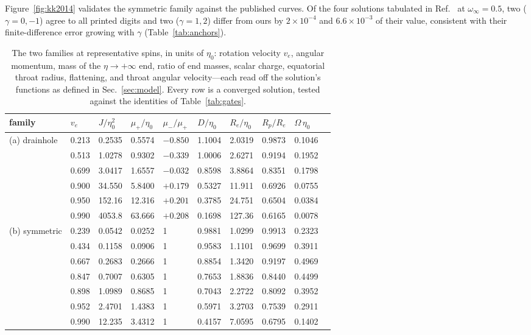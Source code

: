\documentclass[twocolumn,floatfix,aps,prd,superscriptaddress,nofootinbib]{revtex4-2}
\begin{document}
Figure~\ref{fig:kk2014} validates the symmetric family against the published curves. Of the four solutions tabulated in Ref.~\cite{chew2016} at $\omega_\infty=0.5$, two ($\gamma=0,-1$) agree to all printed digits and two ($\gamma=1,2$) differ from ours by $2\times10^{-4}$ and $6.6\times10^{-3}$ of their value, consistent with their finite-difference error growing with $\gamma$ (Table~\ref{tab:anchors}).

\begin{table}[t]
\caption{The two families at representative spins, in units of $\eta_0$: rotation velocity $v_e$, angular momentum, mass of the $\eta\to+\infty$ end, ratio of end masses, scalar charge, equatorial throat radius, flattening, and throat angular velocity---each read off the solution's functions as defined in Sec.~\ref{sec:model}. Every row is a converged solution, tested against the identities of Table~\ref{tab:gates}.}
\label{tab:backgrounds}
\scriptsize
\begin{ruledtabular}
\begin{tabular}{llllllllll}
family & $v_e$ & $J/\eta_0^2$ & $\mu_+/\eta_0$ & $\mu_-/\mu_+$ & $D/\eta_0$ & $R_e/\eta_0$ & $R_p/R_e$ & $\Omega\,\eta_0$ \\
\hline
(a) drainhole & 0.213 & 0.2535 & 0.5574 & $-0.850$ & 1.1004 & 2.0319 & 0.9873 & 0.1046 \\
              & 0.513 & 1.0278 & 0.9302 & $-0.339$ & 1.0006 & 2.6271 & 0.9194 & 0.1952 \\
              & 0.699 & 3.0417 & 1.6557 & $-0.032$ & 0.8598 & 3.8864 & 0.8351 & 0.1798 \\
              & 0.900 & 34.550 & 5.8400 & $+0.179$ & 0.5327 & 11.911 & 0.6926 & 0.0755 \\
              & 0.950 & 152.16 & 12.316 & $+0.201$ & 0.3785 & 24.751 & 0.6504 & 0.0384 \\
              & 0.990 & 4053.8 & 63.666 & $+0.208$ & 0.1698 & 127.36 & 0.6165 & 0.0078 \\
\hline
(b) symmetric & 0.239 & 0.0542 & 0.0252 & 1 & 0.9881 & 1.0299 & 0.9913 & 0.2323 \\
              & 0.434 & 0.1158 & 0.0906 & 1 & 0.9583 & 1.1101 & 0.9699 & 0.3911 \\
              & 0.667 & 0.2683 & 0.2666 & 1 & 0.8854 & 1.3420 & 0.9197 & 0.4969 \\
              & 0.847 & 0.7007 & 0.6305 & 1 & 0.7653 & 1.8836 & 0.8440 & 0.4499 \\
              & 0.898 & 1.0989 & 0.8685 & 1 & 0.7043 & 2.2722 & 0.8092 & 0.3952 \\
              & 0.952 & 2.4701 & 1.4383 & 1 & 0.5971 & 3.2703 & 0.7539 & 0.2911 \\
              & 0.990 & 12.235 & 3.4312 & 1 & 0.4157 & 7.0595 & 0.6795 & 0.1402 \\
\end{tabular}
\end{ruledtabular}
\end{table}
\end{document}

